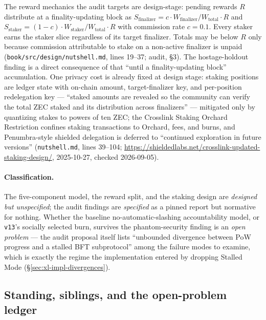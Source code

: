 \documentclass[11pt,a4paper]{article}
\theoremstyle{definition}
\begin{document}
The reward mechanics the audit targets are design-stage: pending rewards
$R$ distribute at a finality-updating block as
$S_{\mathrm{finalizer}} = c \cdot W_{\mathrm{finalizer}} /
W_{\mathrm{total}} \cdot R$ and
$S_{\mathrm{staker}} = (1 - c) \cdot W_{\mathrm{staker}} /
W_{\mathrm{total}} \cdot R$ with commission rate $c = 0.1$. Every staker earns
the staker slice regardless of its target finalizer. Totals may be below
$R$ only because commission attributable to stake on a
non-active finalizer is unpaid (\texttt{book/src/design/nutshell.md},
lines 19--37; audit, \S3). The hostage-holdout finding is a direct consequence of that
``until a finality-updating block'' accumulation. One privacy cost is
already fixed at design stage: staking positions are ledger state with
on-chain amount, target-finalizer key, and per-position redelegation key
--- ``staked amounts are revealed so the community can verify the total
ZEC staked and its distribution across finalizers'' --- mitigated only by
quantizing stakes to powers of ten ZEC; the Crosslink Staking Orchard
Restriction confines staking transactions to Orchard, fees, and burns,
and Penumbra-style shielded delegation is deferred to ``continued
exploration in future versions'' (\texttt{nutshell.md}, lines 39--104;
\url{https://shieldedlabs.net/crosslink-updated-staking-design/},
2025-10-27, checked
2026-09-05).

\paragraph{Classification.} The five-component model, the reward split,
and the staking design are \emph{designed but unspecified}; the audit
findings are \emph{specified} as a pinned report but normative for
nothing. Whether the baseline no-automatic-slashing accountability model,
or \texttt{v13}'s socially selected burn, survives the phantom-security
finding is an \emph{open problem} --- the
audit proposal itself lists ``unbounded divergence between PoW progress
and a stalled BFT subprotocol'' among the failure modes to examine, which
is exactly the regime the implementation entered by dropping Stalled Mode
(\S\ref{sec:xl-impl-divergences}).

\subsection{Standing, siblings, and the open-problem ledger}
\label{sec:xl-open}
\end{document}
